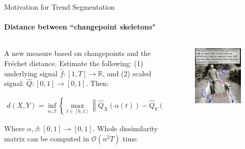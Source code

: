 \documentclass{beamer}
\begin{document}
\begin{frame}{Motivation for Trend Segmentation}
\framesubtitle{Distance between ``changepoint skeletons"}

\begin{columns}

    \begin{column}{0.6\textwidth}
    {\small
    A new measure based on changepoints and the Fréchet distance. Estimate the following: (1) underlying signal  $\widehat{f}: [1,T] \rightarrow \mathbb{R}$, and (2) scaled signal: $\widehat{Q}: [0,1] \rightarrow [0,1]$. Then:

    \begin{align*}
        d(X,Y) = \underset{\alpha,\beta}{\inf} \left \{ \underset{t \in [0,1]}{\max} \left \| \widehat{Q}_X\left ( \alpha(t) \right ) - \widehat{Q}_Y\left ( \beta(t) \right ) \right \| \right \}
    \end{align*}
    
    \text{}
    
    Where $\alpha, \beta : [0,1] \rightarrow [0,1]$. Whole dissimilarity matrix can be computed in $\mathcal{O} \left ( n^2T \right )$ time. 
    }
    \end{column}
    
    \begin{column}{0.4\textwidth}
    \begin{figure}
        \centering
        \includegraphics[width = 1\textwidth,left]{../plots/frechet_dist_illustration.jpg}
    \end{figure}
    \end{column}
    
\end{columns}
    
\end{frame}
\end{document}
